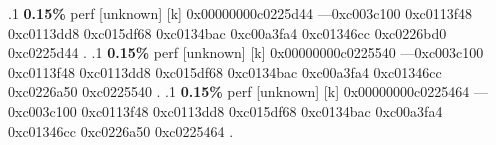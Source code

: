 \begin{profile}
{.1 \textbf{ 0.15\%} perf             [unknown]              [k] 0x00000000c0225d44\newline {} ---0xc003c100\newline {} 0xc0113f48\newline {} 0xc0113dd8\newline {} 0xc015df68\newline {} 0xc0134bac\newline {} 0xc00a3fa4\newline {} 0xc01346cc\newline {} 0xc0226bd0\newline {} 0xc0225d44\newline {} . 
.1 \textbf{ 0.15\%} perf             [unknown]              [k] 0x00000000c0225540\newline {} ---0xc003c100\newline {} 0xc0113f48\newline {} 0xc0113dd8\newline {} 0xc015df68\newline {} 0xc0134bac\newline {} 0xc00a3fa4\newline {} 0xc01346cc\newline {} 0xc0226a50\newline {} 0xc0225540\newline {} . 
.1 \textbf{ 0.15\%} perf             [unknown]              [k] 0x00000000c0225464\newline {} ---0xc003c100\newline {} 0xc0113f48\newline {} 0xc0113dd8\newline {} 0xc015df68\newline {} 0xc0134bac\newline {} 0xc00a3fa4\newline {} 0xc01346cc\newline {} 0xc0226a50\newline {} 0xc0225464\newline {} . 
}
\end{profile}
